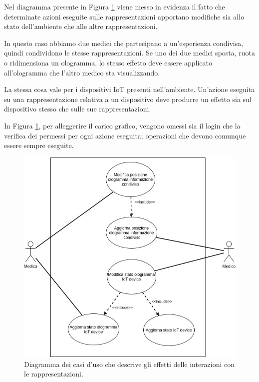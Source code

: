 Nel diagramma presente in Figura \ref{fig:figure42} viene messo in evidenza il fatto che determinate azioni eseguite sulle rappresentazioni apportano modifiche sia allo stato dell'ambiente che alle altre rappresentazioni.

In questo caso abbiamo due medici che partecipano a un'esperienza condivisa, quindi condividono le stesse rappresentazioni.
Se uno dei due medici sposta, ruota o ridimensiona un ologramma, lo stesso effetto deve essere applicato all'ologramma che l'altro medico sta visualizzando.

La stessa cosa vale per i dispositivi IoT presenti nell'ambiente. Un'azione eseguita su una rappresentazione relativa a un dispositivo deve produrre un effetto sia sul dispositivo stesso che sulle sue rappresentazioni.

In Figura \ref{fig:figure42}, per alleggerire il carico grafico, vengono omessi sia il login che la verifica dei permessi per ogni azione eseguita; operazioni che devono comunque essere sempre eseguite.

\begin{figure}[H]
    \centering
    \includegraphics[width=\textwidth]{images/Casi uso-Page-2.jpg}
    \caption{Diagramma dei casi d'uso che descrive gli effetti delle interazioni con le rappresentazioni.}
    \label{fig:figure42}
\end{figure}

